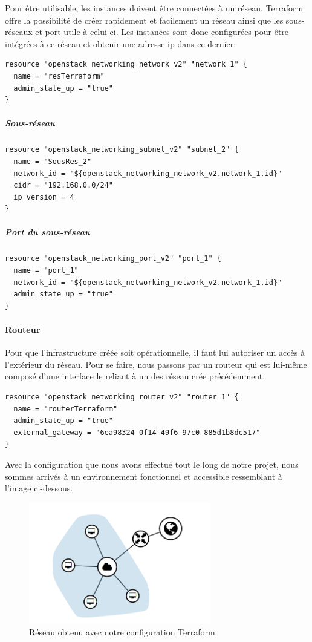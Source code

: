 \documentclass[]{article}
\let\oldparagraph\paragraph
\renewcommand{\paragraph}[1]{\oldparagraph{#1}\mbox{}}
\let\oldsubparagraph\subparagraph
\renewcommand{\subparagraph}[1]{\oldsubparagraph{#1}\mbox{}}
\begin{document}
Pour être utilisable, les instances doivent être connectées à un réseau.
Terraform offre la possibilité de créer rapidement et facilement un
réseau ainsi que les sous-réseaux et port utile à celui-ci. Les
instances sont donc configurées pour être intégrées à ce réseau et
obtenir une adresse ip dans ce dernier. 
\begin{verbatim}
resource "openstack_networking_network_v2" "network_1" {
  name = "resTerraform"
  admin_state_up = "true"
}
\end{verbatim}

\subparagraph{Sous-réseau}\label{sous-ruxe9seau}
\begin{verbatim}
resource "openstack_networking_subnet_v2" "subnet_2" {
  name = "SousRes_2"
  network_id = "${openstack_networking_network_v2.network_1.id}"
  cidr = "192.168.0.0/24"
  ip_version = 4 
}
\end{verbatim}

\subparagraph{Port du sous-réseau}\label{port-du-sous-ruxe9seau}
\begin{verbatim}
resource "openstack_networking_port_v2" "port_1" {
  name = "port_1"
  network_id = "${openstack_networking_network_v2.network_1.id}"
  admin_state_up = "true"
}
\end{verbatim}

\paragraph{Routeur}\label{routeur}

Pour que l'infrastructure créée soit opérationnelle, il faut lui
autoriser un accès à l'extérieur du réseau. Pour se faire, nous passons
par un routeur qui est lui-même composé d'une interface le reliant à un
des réseau crée précédemment.
\begin{verbatim}
resource "openstack_networking_router_v2" "router_1" {
  name = "routerTerraform"
  admin_state_up = "true"
  external_gateway = "6ea98324-0f14-49f6-97c0-885d1b8dc517"
}
\end{verbatim}

\vspace{1cm}
Avec la configuration que nous avons effectué tout le long de notre projet, nous sommes arrivés à un environnement fonctionnel et accessible ressemblant à l'image ci-dessous.
\begin{figure}
\centering
\includegraphics[height=200px]{Images/reseau.png}
\caption{Réseau obtenu avec notre configuration Terraform}
\end{figure}
\end{document}
